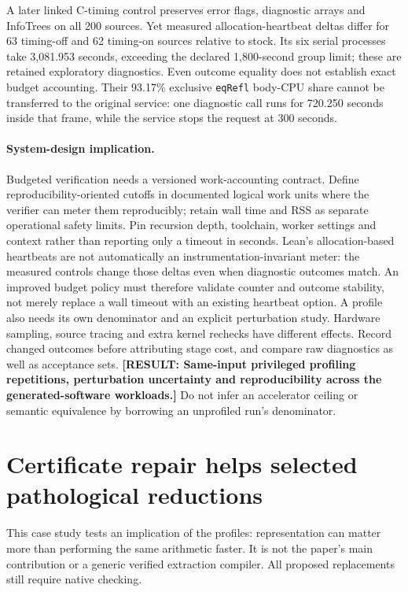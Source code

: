 \documentclass[10pt,twocolumn]{article}
\newcommand{\missing}[1]{\textbf{[RESULT: #1]}}
\begin{document}
A later linked C-timing control preserves error flags, diagnostic arrays
and InfoTrees on all 200 sources. Yet measured allocation-heartbeat deltas
differ for 63 timing-off and 62 timing-on sources relative to stock.
Its six serial processes take 3,081.953 seconds, exceeding the declared
1,800-second group limit; these are retained exploratory diagnostics.
Even outcome equality does not establish exact budget accounting.
Their 93.17\% exclusive \texttt{eqRefl} body-CPU share cannot be transferred
to the original service: one diagnostic call runs for 720.250 seconds
inside that frame, while the service stops the request at 300 seconds.

\paragraph{System-design implication.}
Budgeted verification needs a versioned work-accounting contract.
Define reproducibility-oriented cutoffs in documented logical work units
where the verifier can meter them reproducibly; retain wall time and RSS as
separate operational safety limits. Pin recursion depth, toolchain, worker
settings and context rather than reporting only a timeout in seconds.
Lean's allocation-based heartbeats are not automatically an
instrumentation-invariant meter: the measured controls change those deltas
even when diagnostic outcomes match. An improved budget policy must
therefore validate counter and outcome stability, not merely replace a wall
timeout with an existing heartbeat option.
A profile also needs its own denominator and an explicit perturbation study.
Hardware sampling, source tracing and extra kernel rechecks have different
effects. Record changed outcomes before attributing stage cost, and compare
raw diagnostics as well as acceptance sets.
\missing{Same-input privileged profiling repetitions, perturbation
uncertainty and reproducibility across the generated-software workloads.}
Do not infer an accelerator ceiling or semantic equivalence by borrowing an
unprofiled run's denominator.

\section{Certificate repair helps selected pathological reductions}
\label{sec:certificates}
This case study tests an implication of the profiles: representation can
matter more than performing the same arithmetic faster.
It is not the paper's main contribution or a generic verified extraction
compiler. All proposed replacements still require native checking.
\end{document}
